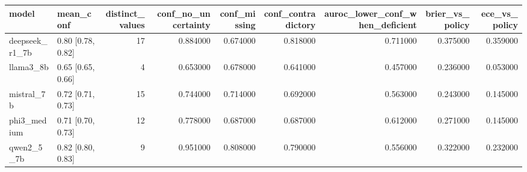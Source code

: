 \begin{tabular}{llrrrrrrr}
\toprule
model & mean\_conf & distinct\_values & conf\_no\_uncertainty & conf\_missing & conf\_contradictory & auroc\_lower\_conf\_when\_deficient & brier\_vs\_policy & ece\_vs\_policy \\
\midrule
deepseek\_r1\_7b & 0.80 [0.78, 0.82] & 17 & 0.884000 & 0.674000 & 0.818000 & 0.711000 & 0.375000 & 0.359000 \\
llama3\_8b & 0.65 [0.65, 0.66] & 4 & 0.653000 & 0.678000 & 0.641000 & 0.457000 & 0.236000 & 0.053000 \\
mistral\_7b & 0.72 [0.71, 0.73] & 15 & 0.744000 & 0.714000 & 0.692000 & 0.563000 & 0.243000 & 0.145000 \\
phi3\_medium & 0.71 [0.70, 0.73] & 12 & 0.778000 & 0.687000 & 0.687000 & 0.612000 & 0.271000 & 0.145000 \\
qwen2\_5\_7b & 0.82 [0.80, 0.83] & 9 & 0.951000 & 0.808000 & 0.790000 & 0.556000 & 0.322000 & 0.232000 \\
\bottomrule
\end{tabular}
